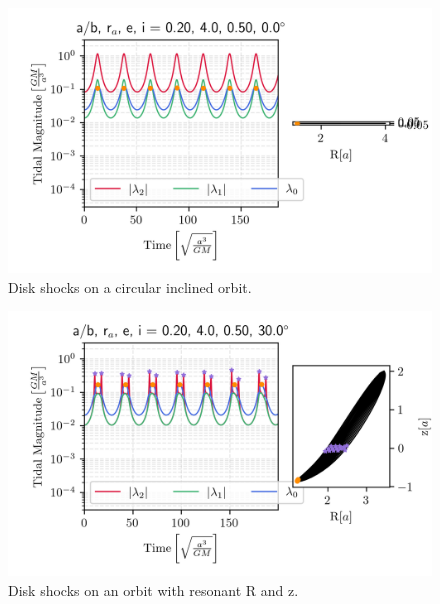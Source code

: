             \begin{figure}
                \includegraphics[width=\linewidth]{images/miyamoto_disc_shocks_ab_rp_e_i_0.20_4.0_0.50_0.0.png}
                \caption{Disk shocks on a circular inclined orbit.}
                \label{fig:miyamoto_disc_shocks_circular_inclined_orbit}
            \end{figure}

            \begin{figure}
                \includegraphics[width=\linewidth]{images/miyamoto_disc_shocks_ab_rp_e_i_0.20_4.0_0.50_30.0.png}
                \caption{Disk shocks on an orbit with resonant R and z.}
                \label{fig:miyamoto_disc_shocks_responant_R_z}
            \end{figure}
            
